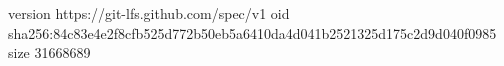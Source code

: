 version https://git-lfs.github.com/spec/v1
oid sha256:84c83e4e2f8cfb525d772b50eb5a6410da4d041b2521325d175c2d9d040f0985
size 31668689
